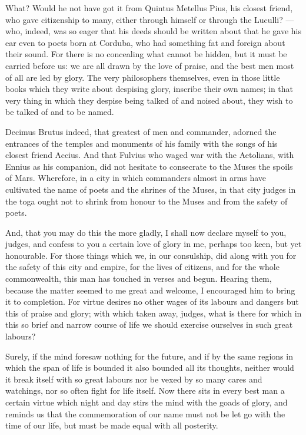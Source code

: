 What? Would he not have got it from Quintus Metellus Pius, his closest friend, who gave citizenship to many, either through himself or through the Luculli? --- who, indeed, was so eager that his deeds should be written about that he gave his ear even to poets born at Corduba, who had something fat and foreign about their sound. For there is no concealing what cannot be hidden, but it must be carried before us: we are all drawn by the love of praise, and the best men most of all are led by glory. The very philosophers themselves, even in those little books which they write about despising glory, inscribe their own names; in that very thing in which they despise being talked of and noised about, they wish to be talked of and to be named.

 Decimus Brutus indeed, that greatest of men and commander, adorned the entrances of the temples and monuments of his family with the songs of his closest friend Accius. And that Fulvius who waged war with the Aetolians, with Ennius as his companion, did not hesitate to consecrate to the Muses the spoils of Mars. Wherefore, in a city in which commanders almost in arms have cultivated the name of poets and the shrines of the Muses, in that city judges in the toga ought not to shrink from honour to the Muses and from the safety of poets.

 And, that you may do this the more gladly, I shall now declare myself to you, judges, and confess to you a certain love of glory in me, perhaps too keen, but yet honourable. For those things which we, in our consulship, did along with you for the safety of this city and empire, for the lives of citizens, and for the whole commonwealth, this man has touched in verses and begun. Hearing them, because the matter seemed to me great and welcome, I encouraged him to bring it to completion. For virtue desires no other wages of its labours and dangers but this of praise and glory; with which taken away, judges, what is there for which in this so brief and narrow course of life we should exercise ourselves in such great labours?

 Surely, if the mind foresaw nothing for the future, and if by the same regions in which the span of life is bounded it also bounded all its thoughts, neither would it break itself with so great labours nor be vexed by so many cares and watchings, nor so often fight for life itself. Now there sits in every best man a certain virtue which night and day stirs the mind with the goads of glory, and reminds us that the commemoration of our name must not be let go with the time of our life, but must be made equal with all posterity.

